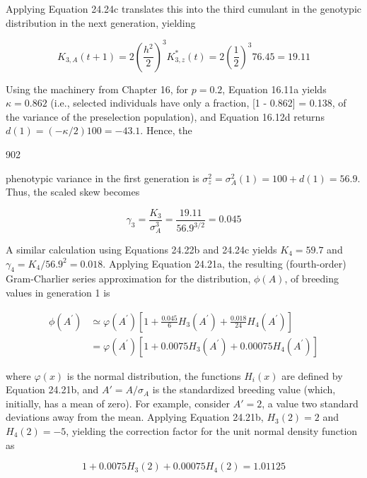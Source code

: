 \documentclass{article}
\begin{document}
Applying Equation 24.24c translates this into the third cumulant in the genotypic distribution in the next generation, yielding

\begin{equation}
K_{3,A}(t+1)=2\left(\frac{h^{2}}{2}\right)^{3}K_{3,z}^{*}(t)=2\left(\frac{1}{2}\right)^{3}76.45=19.11
\end{equation}

Using the machinery from Chapter 16, for $p = 0.2$, Equation 16.11a yields $\kappa = 0.862$ (i.e., selected individuals have only a fraction, [1 - 0.862] = 0.138, of the variance of the preselection population), and Equation 16.12d returns $d(1) = (-\kappa/2)100 = -43.1$. Hence, the

902

phenotypic variance in the first generation is  $ \sigma_{z}^{2} = \sigma_{A}^{2}(1) = 100 + d(1) = 56.9 $. Thus, the scaled skew becomes

\begin{equation}
\gamma_{3}=\frac{K_{3}}{\sigma_{A}^{3}}=\frac{19.11}{56.9^{3/2}}=0.045
\end{equation}

A similar calculation using Equations 24.22b and 24.24c yields  $ K_4 = 59.7 $ and  $ \gamma_4 = K_4/56.9^2 = 0.018 $. Applying Equation 24.21a, the resulting (fourth-order) Gram-Charlier series approximation for the distribution,  $ \phi(A) $, of breeding values in generation 1 is

\begin{equation}
\begin{align*}\phi(A^{\prime})&\simeq\varphi(A^{\prime})\left[1+\frac{0.045}{6}H_{3}(A^{\prime})+\frac{0.018}{24}H_{4}(A^{\prime})\right]\\&=\varphi(A^{\prime})\left[1+0.0075H_{3}(A^{\prime})+0.00075H_{4}(A^{\prime})\right]\end{align*}
\end{equation}

where  $ \varphi(x) $ is the normal distribution, the functions  $ H_i(x) $ are defined by Equation 24.21b, and  $ A' = A/\sigma_A $ is the standardized breeding value (which, initially, has a mean of zero). For example, consider  $ A' = 2 $, a value two standard deviations away from the mean. Applying Equation 24.21b,  $ H_3(2) = 2 $ and  $ H_4(2) = -5 $, yielding the correction factor for the unit normal density function as

\begin{equation}
1+0.0075H_{3}(2)+0.00075H_{4}(2)=1.01125
\end{equation}
\end{document}
